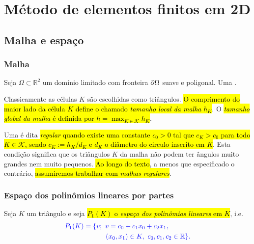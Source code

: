 
\chapter{Método de elementos finitos em 2D}\label{cap_mef2d}
\thispagestyle{fancy}

\section{Malha e espaço}\label{cap_mef2d_sec_malha}
\badgeRevisar

\subsection{Malha}
\badgeRevisar

Seja $\Omega\subset \mathbb{R}^2$ um domínio limitado com fronteira $\partial\Omega$ suave e poligonal. Uma .

Classicamente as células $K$ são escolhidas como triângulos. \hl{O comprimento do maior lado da célula $K$ define o chamado \emph{tamanho local da malha} $h_K$}. O \hl{\emph{tamanho global da malha} é definida por $h = \max_{K\in\mathcal{K}} h_K$}.

Uma  é dita \hl{\emph{regular} quando existe uma constante $c_0 > 0$ tal que $c_K > c_0$ para todo $K\in\mathcal{K}$, sendo $c_K := h_K/d_K$ e $d_K$ o diâmetro do circulo inscrito em $K$}. Esta condição significa que os triângulos $K$ da malha não podem ter ângulos muito grandes nem muito pequenos. \hl{Ao longo do texto}, a menos que especificado o contrário, \hl{assumiremos trabalhar com \emph{malhas regulares}}.

\subsection{Espaço dos polinômios lineares por partes}
\badgeRevisar

Seja $K$ um triângulo e seja \hl{$P_1(K)$ o \emph{espaço dos polinômios lineares} em $K$}, i.e.
\begin{equation}\color{blue}\begin{aligned}
    &P_1(K) = \{v;~v=c_0+c_1x_0+c_2x_1,\\
    &\qquad\qquad\qquad(x_0,x_1)\in K,~c_0,c_1,c_2\in\mathbb{R}\}.
  \end{aligned}
\end{equation}

